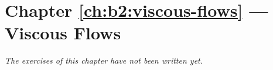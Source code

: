 \section*{Chapter \ref{ch:b2:viscous-flows} --- Viscous Flows}


\emph{The exercises of this chapter have not been written yet.}
